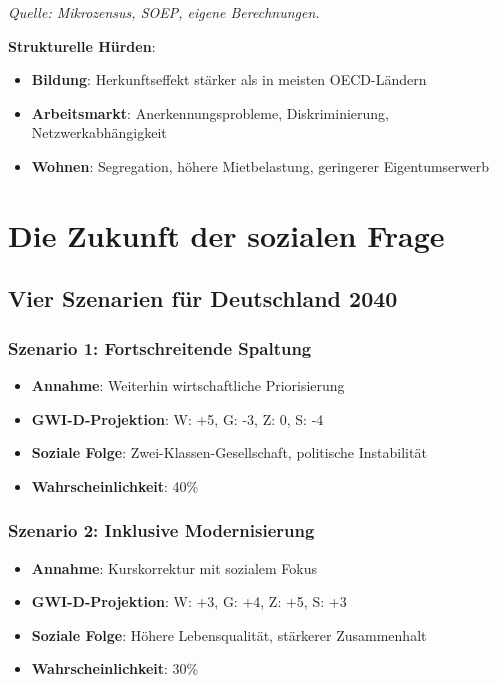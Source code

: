 \begin{flushleft}
\footnotesize{\textit{Quelle: Mikrozensus, SOEP, eigene Berechnungen.}}
\end{flushleft}

\textbf{Strukturelle Hürden}:
\begin{itemize}
    \item \textbf{Bildung}: Herkunftseffekt stärker als in meisten OECD-Ländern
    \item \textbf{Arbeitsmarkt}: Anerkennungsprobleme, Diskriminierung, Netzwerkabhängigkeit
    \item \textbf{Wohnen}: Segregation, höhere Mietbelastung, geringerer Eigentumserwerb
\end{itemize}

\section{Die Zukunft der sozialen Frage}

\subsection{Vier Szenarien für Deutschland 2040}

\subsubsection{Szenario 1: Fortschreitende Spaltung}

\begin{itemize}
    \item \textbf{Annahme}: Weiterhin wirtschaftliche Priorisierung
    \item \textbf{GWI-D-Projektion}: W: +5, G: -3, Z: 0, S: -4
    \item \textbf{Soziale Folge}: Zwei-Klassen-Gesellschaft, politische Instabilität
    \item \textbf{Wahrscheinlichkeit}: 40\%
\end{itemize}

\subsubsection{Szenario 2: Inklusive Modernisierung}

\begin{itemize}
    \item \textbf{Annahme}: Kurskorrektur mit sozialem Fokus
    \item \textbf{GWI-D-Projektion}: W: +3, G: +4, Z: +5, S: +3
    \item \textbf{Soziale Folge}: Höhere Lebensqualität, stärkerer Zusammenhalt
    \item \textbf{Wahrscheinlichkeit}: 30\%
\end{itemize}

